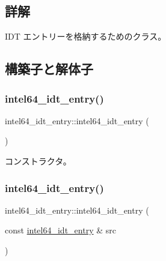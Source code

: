 \subsection{詳解}
I\+DT エントリーを格納するためのクラス。 

\subsection{構築子と解体子}
\hypertarget{classintel64__idt__entry_a5de85577bab9c8940d5fc6a85a49edb3}{}\label{classintel64__idt__entry_a5de85577bab9c8940d5fc6a85a49edb3} 
\subsubsection{\texorpdfstring{intel64\+\_\+idt\+\_\+entry()}{intel64\_idt\_entry()}\hspace{0.1cm}{\footnotesize\ttfamily [1/3]}}
{\footnotesize\ttfamily intel64\+\_\+idt\+\_\+entry\+::intel64\+\_\+idt\+\_\+entry (\begin{DoxyParamCaption}{ }\end{DoxyParamCaption})}

コンストラクタ。 \hypertarget{classintel64__idt__entry_a9807a01902efadb7e54be2772b844f69}{}\label{classintel64__idt__entry_a9807a01902efadb7e54be2772b844f69} 
\subsubsection{\texorpdfstring{intel64\+\_\+idt\+\_\+entry()}{intel64\_idt\_entry()}\hspace{0.1cm}{\footnotesize\ttfamily [2/3]}}
{\footnotesize\ttfamily intel64\+\_\+idt\+\_\+entry\+::intel64\+\_\+idt\+\_\+entry (\begin{DoxyParamCaption}\item[{const \hyperlink{classintel64__idt__entry}{intel64\+\_\+idt\+\_\+entry} \&}]{src }\end{DoxyParamCaption})\hspace{0.3cm}{\ttfamily [delete]}}

